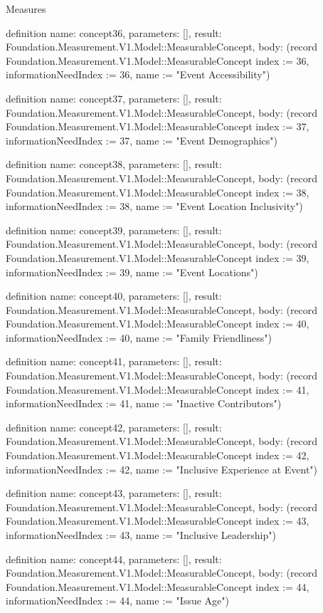 \begin{lexlean}{Measures}
\begin{semanticmodule}
definition{
  name: concept36,
  parameters: [],
  result: Foundation.Measurement.V1.Model::MeasurableConcept,
  body: (record Foundation.Measurement.V1.Model::MeasurableConcept {index := 36, informationNeedIndex := 36, name := "Event Accessibility"})
}

definition{
  name: concept37,
  parameters: [],
  result: Foundation.Measurement.V1.Model::MeasurableConcept,
  body: (record Foundation.Measurement.V1.Model::MeasurableConcept {index := 37, informationNeedIndex := 37, name := "Event Demographics"})
}

definition{
  name: concept38,
  parameters: [],
  result: Foundation.Measurement.V1.Model::MeasurableConcept,
  body: (record Foundation.Measurement.V1.Model::MeasurableConcept {index := 38, informationNeedIndex := 38, name := "Event Location Inclusivity"})
}

definition{
  name: concept39,
  parameters: [],
  result: Foundation.Measurement.V1.Model::MeasurableConcept,
  body: (record Foundation.Measurement.V1.Model::MeasurableConcept {index := 39, informationNeedIndex := 39, name := "Event Locations"})
}

definition{
  name: concept40,
  parameters: [],
  result: Foundation.Measurement.V1.Model::MeasurableConcept,
  body: (record Foundation.Measurement.V1.Model::MeasurableConcept {index := 40, informationNeedIndex := 40, name := "Family Friendliness"})
}

definition{
  name: concept41,
  parameters: [],
  result: Foundation.Measurement.V1.Model::MeasurableConcept,
  body: (record Foundation.Measurement.V1.Model::MeasurableConcept {index := 41, informationNeedIndex := 41, name := "Inactive Contributors"})
}

definition{
  name: concept42,
  parameters: [],
  result: Foundation.Measurement.V1.Model::MeasurableConcept,
  body: (record Foundation.Measurement.V1.Model::MeasurableConcept {index := 42, informationNeedIndex := 42, name := "Inclusive Experience at Event"})
}

definition{
  name: concept43,
  parameters: [],
  result: Foundation.Measurement.V1.Model::MeasurableConcept,
  body: (record Foundation.Measurement.V1.Model::MeasurableConcept {index := 43, informationNeedIndex := 43, name := "Inclusive Leadership"})
}

definition{
  name: concept44,
  parameters: [],
  result: Foundation.Measurement.V1.Model::MeasurableConcept,
  body: (record Foundation.Measurement.V1.Model::MeasurableConcept {index := 44, informationNeedIndex := 44, name := "Issue Age"})
}


\end{semanticmodule}
\end{lexlean}
